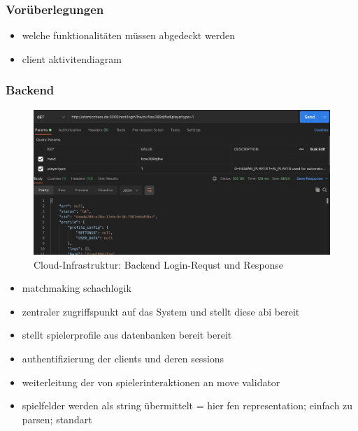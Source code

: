 \hypertarget{voruxfcberlegungen}{%
\subsubsection{Vorüberlegungen}\label{voruxfcberlegungen}}

\begin{itemize}
\tightlist
\item
  welche funktionalitäten müssen abgedeckt werden
\item
  client aktivitendiagram
\end{itemize}

\hypertarget{backend}{%
\subsubsection{Backend}\label{backend}}

\begin{figure}
\centering
\includegraphics{images/ATC_request_example.png}
\caption{Cloud-Infrastruktur: Backend Login-Requst und Response}
\end{figure}

\begin{itemize}
\tightlist
\item
  matchmaking schachlogik
\item
  zentraler zugriffspunkt auf das System und stellt diese abi bereit
\item
  stellt spielerprofile aus datenbanken bereit bereit
\item
  authentifizierung der clients und deren sessions
\item
  weiterleitung der von spielerinteraktionen an move validator
\item
  spielfelder werden als string übermittelt = hier fen representation;
  einfach zu parsen; standart
\end{itemize}

